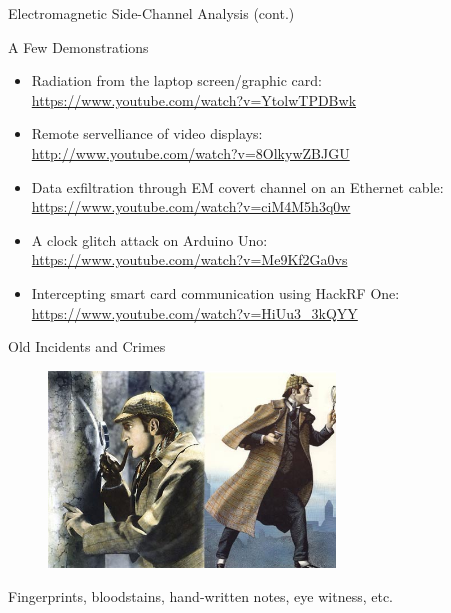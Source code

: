 \documentclass[handout]{beamer}
\begin{document}
\begin{frame}{Electromagnetic Side-Channel Analysis (cont.)}  

\footnotesize
A Few Demonstrations
\vspace{10pt}

\begin{itemize}
	\footnotesize
	\item Radiation from the laptop screen/graphic card:\\ \url{https://www.youtube.com/watch?v=YtolwTPDBwk}
	\vspace{10pt}
	\item Remote servelliance of video displays:\\ \url{http://www.youtube.com/watch?v=8OlkywZBJGU}
	\vspace{10pt}
	\item Data exfiltration through EM covert channel on an Ethernet cable:\\ \url{https://www.youtube.com/watch?v=ciM4M5h3q0w}
	\vspace{10pt}
	\item A clock glitch attack on Arduino Uno:\\ \url{https://www.youtube.com/watch?v=Me9Kf2Ga0vs}
	\vspace{10pt}
	\item Intercepting smart card communication using HackRF One:\\ \url{https://www.youtube.com/watch?v=HiUu3\_3kQYY}
\end{itemize}

\end{frame}


\begin{frame}{Old Incidents and Crimes}

\begin{figure}
   \includegraphics[width=3in]{figures/old-incidents.jpg}
\end{figure}

\pause
\footnotesize
Fingerprints, bloodstains, hand-written notes, eye witness, etc.

\end{frame}
\end{document}
